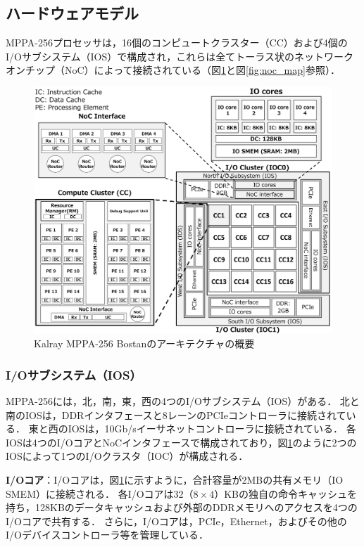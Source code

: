 \documentclass[submit,techrep]{ipsj_v2/UTF8/ipsj}
\begin{document}
\subsection{ハードウェアモデル}
\label{sec:hardware_model}
MPPA-256プロセッサは，16個のコンピュートクラスター（CC）および4個のI/Oサブシステム（IOS）で構成され，これらは全てトーラス状のネットワークオンチップ（NoC）によって接続されている（図\ref{fig:mppa_architecture}と図\ref{fig:noc_map}参照）．

\begin{figure}[t]
  \centering
  \includegraphics[width=1.0\linewidth]{../figure/mppa_architecture.pdf}
  \caption{\label{fig:mppa_architecture}
    Kalray MPPA-256 Bostanのアーキテクチャの概要}
\end{figure}

\setlength{\headheight}{0pt}

\subsubsection{I/Oサブシステム（IOS）}
\label{sec:ios}
MPPA-256には，北，南，東，西の4つのI/Oサブシステム（IOS）がある．
北と南のIOSは，DDRインタフェースと8レーンのPCIeコントローラに接続されている．
東と西のIOSは，10Gb/sイーサネットコントローラに接続されている．
各IOSは4つのI/OコアとNoCインタフェースで構成されており，図\ref{fig:mppa_architecture}のように2つのIOSによって1つのI/Oクラスタ（IOC）が構成される．

\textbf{I/Oコア}：I/Oコアは，図\ref{fig:mppa_architecture}に示すように，合計容量が2MBの共有メモリ（IO SMEM）に接続される．
各I/Oコアは32（$ 8 \times 4 $）KBの独自の命令キャッシュを持ち，128KBのデータキャッシュおよび外部のDDRメモリへのアクセスを4つのI/Oコアで共有する．
さらに，I/Oコアは，PCIe，Ethernet，およびその他のI/Oデバイスコントローラ等を管理している．
\end{document}
